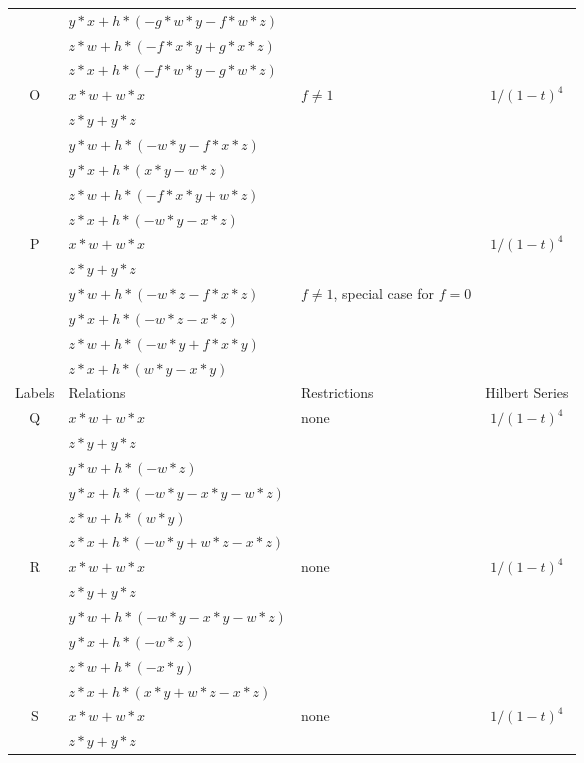 \documentclass[12]{article}
\begin{document}
\begin{longtable}[c]{|c|p{5.75cm}|p{2.75cm}|c|}
   & $ y*x + h*(-g*w*y - f*w*z )  $ & & \\  
   & $ z*w + h*(-f*x*y + g*x*z ) $ & & \\ 
   & $ z*x + h*(-f*w*y - g*w*z ) $ & &  \\  
\hline
 O & $ x*w + w*x $ &\multirow{6}{*}{$ f \neq 1 $} &\multirow{6}{*}{$ 1/(1-t)^4 $} \\ 
    & $ z*y + y*z $ & &  \\ 
   & $ y*w + h*(-w*y - f*x*z ) $ & & \\  
   & $ y*x + h*(x*y - w*z ) $ & & \\  
   & $  z*w + h*(-f*x*y + w*z ) $ & & \\ 
   & $ z*x + h*(-w*y - x*z ) $ & &  \\  
\hline
 P & $ x*w + w*x $ & &\multirow{6}{*}{$ 1/(1-t)^4 $} \\ 
    & $ z*y + y*z $ & &  \\ 
   & $ y*w + h*(-w*z - f*x*z ) $ & $ f\neq1 $, special case for $ f=0 $ & \\
   & $ y*x + h*(-w*z - x*z ) $ & & \\  
   & $  z*w + h*(-w*y + f*x*y ) $ & & \\ 
   & $ z*x + h*(w*y - x*y ) $ & &  \\  
\hline
\pagebreak
\midrule[1.0pt]
Labels & Relations & Restrictions & Hilbert Series \\
\hline
 Q & $ x*w + w*x $ &\multirow{6}{*}{none} &\multirow{6}{*}{$ 1/(1-t)^4 $} \\ 
    & $ z*y + y*z $ & &  \\ 
   & $ y*w + h*(-w*z) $ & & \\  
   & $ y*x + h*(-w*y - x*y - w*z ) $ & & \\  
   & $ z*w + h*(w*y ) $ & & \\ 
   & $ z*x + h*(-w*y + w*z - x*z ) $ & &  \\  
\hline
 R & $ x*w + w*x $ &\multirow{6}{*}{none} &\multirow{6}{*}{$ 1/(1-t)^4 $} \\ 
    & $ z*y + y*z $ & &  \\ 
   & $ y*w + h*(-w*y - x*y - w*z ) $ & & \\  
   & $  y*x + h*(-w*z ) $ & & \\  
   & $ z*w + h*(-x*y ) $ & & \\ 
   & $ z*x + h*(x*y + w*z - x*z ) $ & &  \\  
\hline
 S & $ x*w + w*x $ &\multirow{6}{*}{none} &\multirow{6}{*}{$ 1/(1-t)^4 $} \\ 
    & $ z*y + y*z $ & &  \\  

\end{longtable}
\end{document}
